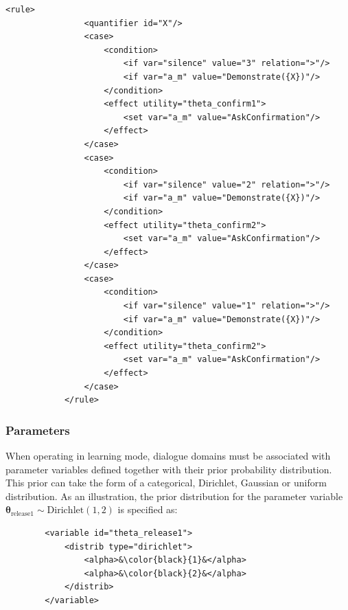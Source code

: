 \begin{lstlisting}[label=listing:xml2,caption=Example of utility rule in XML format., float=p,captionpos=b]
            <rule>
                <quantifier id="X"/>
                <case>
                    <condition>
                        <if var="silence" value="3" relation=">"/>
                        <if var="a_m" value="Demonstrate({X})"/>
                    </condition>
                    <effect utility="theta_confirm1">
                        <set var="a_m" value="AskConfirmation"/>
                    </effect>
                </case>
                <case>
                    <condition>
                        <if var="silence" value="2" relation=">"/>
                        <if var="a_m" value="Demonstrate({X})"/>
                    </condition>
                    <effect utility="theta_confirm2">
                        <set var="a_m" value="AskConfirmation"/>
                    </effect>
                </case>
                <case>
                    <condition>
                        <if var="silence" value="1" relation=">"/>
                        <if var="a_m" value="Demonstrate({X})"/>
                    </condition>
                    <effect utility="theta_confirm2">
                        <set var="a_m" value="AskConfirmation"/>
                    </effect>
                </case>
            </rule>
\end{lstlisting}

\subsubsection*{Parameters}

When operating in learning mode, dialogue domains must be associated with parameter variables defined together with their prior probability distribution.  This prior can take the form of a categorical, Dirichlet, Gaussian or uniform distribution.  As an illustration, the prior distribution for the parameter variable $\boldsymbol\theta_{\text{release1}} \sim \mathrm{Dirichlet}(1,2)$ is specified as: 

\vspace{3mm}\begin{lstlisting}
        <variable id="theta_release1">
            <distrib type="dirichlet">
                <alpha>&\color{black}{1}&</alpha>
                <alpha>&\color{black}{2}&</alpha>
            </distrib>
        </variable>
\end{lstlisting}\vspace{2mm}


